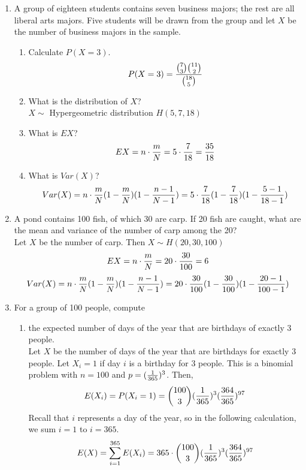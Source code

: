 \documentclass[12pt]{article}%
\newcommand{\0}{{\bf 0}}
\begin{document}
\begin{enumerate}
\item
A group of eighteen students contains seven business majors; the rest are all liberal arts majors. 
Five students will be drawn from the group and let $X$ be the number of business majors in the sample.
\begin{enumerate}
\item Calculate $P(X=3)$.
\\
{\color{blue}{\bf Sol.}}
$$P(X=3)=\frac{{7 \choose 3}{11 \choose 2}}{{18 \choose 5}}$$
\item What is the distribution of $X$?
\\
{\color{blue}{\bf Sol.}}
$X \sim $ Hypergeometric distribution $H(5,7,18)$
\item What is $EX$?
\\
{\color{blue}{\bf Sol.}}
$$EX=n\cdot \frac{m}{N}=5\cdot \frac{7}{18}=\frac{35}{18}$$
\item What is $Var(X)$?
\\
{\color{blue}{\bf Sol.}}
$$Var(X)=n\cdot\frac{m}{N}(1-\frac{m}{N})(1-\frac{n-1}{N-1})=5\cdot\frac{7}{18}(1-\frac{7}{18})(1-\frac{5-1}{18-1})$$
\end{enumerate}


\item
A pond contains 100 fish, of which 30 are carp. If 20 fish are caught, what are the mean and variance of the number of carp among the 20? 
\\
{\color{blue}{\bf Sol.}}
Let $X$ be the number of carp. Then $X \sim H(20,30,100)$ 
$$EX=n\cdot \frac{m}{N}=20\cdot \frac{30}{100}=6$$
$$Var(X)=n\cdot\frac{m}{N}(1-\frac{m}{N})(1-\frac{n-1}{N-1})=20 \cdot\frac{30}{100}(1-\frac{30}{100})(1-\frac{20-1}{100-1})$$





\item
For a group of 100 people, compute
\begin{enumerate}
\item the expected number of days of the year that
are birthdays of exactly 3 people.
\\
{\color{blue}{\bf Sol.}}
Let $X$ be the number of days of the year that are birthdays for exactly $3$ people. Let
 $X_i = 1$ if day $i$ is a birthday for $3$ people. This is a binomial problem with $n = 100$ and $p = (\frac{1}{365})^3$. Then,
$$E(X_i) = P(X_i = 1) = { 100 \choose 3}(\frac{1}{365})^3(\frac{364}{365})^{97}$$
Recall that $i$ represents a day of the year, so in the following calculation, we sum $i = 1$ to $i = 365$.
$$E(X)=\sum_{i=1}^{365} E(X_i)=365\cdot{ 100 \choose 3}(\frac{1}{365})^3(\frac{364}{365})^{97}$$


\end{enumerate}
\end{enumerate}
\end{document}
